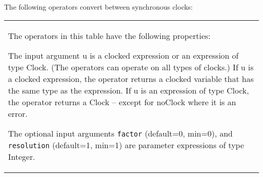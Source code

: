 The following operators convert between synchronous clocks:
\begin{longtable}[]{|p{4cm}|p{11cm}|}
\hline \endhead
\multicolumn{2}{|p{15cm}|}{
The operators in this table have the following properties:

The input argument u is a clocked expression or an expression of type
Clock.  (The operators can operate on all types of clocks.)  If
u is a clocked expression, the operator returns a clocked variable that
has the same type as the expression. If u is an expression of type
Clock, the operator returns a Clock -- except for noClock where it is an error.

The optional input arguments \lstinline!factor! (default=0, min=0), and \lstinline!resolution!
(default=1, min=1) are parameter expressions of type Integer.

}
\end{longtable}
